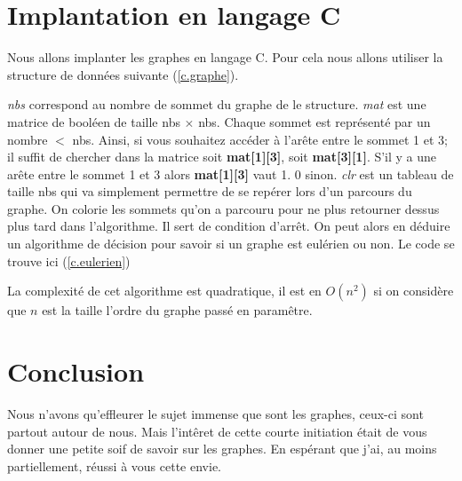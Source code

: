 \documentclass[12pt,a4paper]{scrartcl}
\theoremstyle{plain}
\theoremstyle{remark}
\begin{document}
\section{Implantation en langage C}

Nous allons implanter les graphes en langage C. Pour cela nous allons utiliser la structure de données suivante (\ref{c.graphe}).


\label{c.graphe}
\textit{nbs} correspond au nombre de sommet du graphe de le structure. \textit{mat} est une matrice de booléen de taille  nbs $\times$ nbs. Chaque sommet est représenté par un nombre $<$ nbs. Ainsi, si vous souhaitez accéder à l'arête entre le sommet 1 et 3; il suffit de chercher dans la matrice soit \textbf{mat[1][3]}, soit \textbf{mat[3][1]}. S'il y a une arête entre le sommet 1 et 3 alors \textbf{mat[1][3]} vaut 1. 0 sinon. \textit{clr} est un tableau de taille nbs qui va simplement permettre de se repérer lors d'un parcours du graphe. On colorie les sommets qu'on a parcouru pour ne plus retourner dessus plus tard dans l'algorithme. Il sert de condition d'arrêt.
On peut alors en déduire un algorithme de décision pour savoir si un graphe est eulérien ou non. Le code se trouve ici (\ref{c.eulerien})

\label{c.eulerien}

La complexité de cet algorithme est quadratique, il est en $O(n^2)$ si on considère que $n$ est la taille l'ordre du graphe passé en paramêtre.

\section{Conclusion}

Nous n'avons qu'effleurer le sujet immense que sont les graphes, ceux-ci sont partout autour de nous. Mais l'intêret de cette courte initiation était de vous donner une petite soif de savoir sur les graphes. En espérant que j'ai, au moins partiellement, réussi à vous cette envie.


\end{document}
